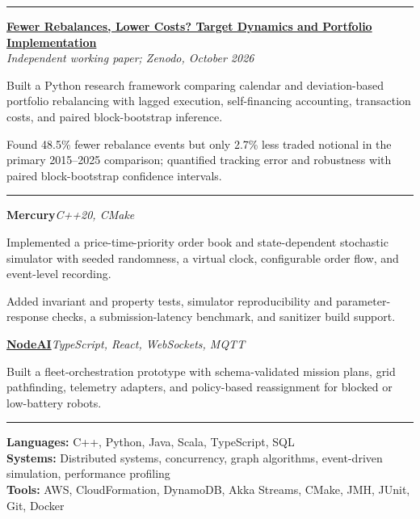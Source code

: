 \documentclass[10pt,letterpaper]{article}
\renewenvironment{itemize}{\begin{list}{\textbullet}{\setlength{\leftmargin}{13pt}\setlength{\itemsep}{2pt}\setlength{\topsep}{3pt}\setlength{\parsep}{0pt}}}{\end{list}}
\renewcommand{\section}[1]{\par\vspace{9pt}{\large\bfseries #1}\par\vspace{2pt}\hrule\vspace{5pt}}
\begin{document}
\section{Research}
\textbf{\href{https://zenodo.org/records/23298207}{Fewer Rebalances, Lower Costs? Target Dynamics and Portfolio Implementation}}\\
\textit{Independent working paper; Zenodo, October 2026}
\begin{itemize}
\item Built a Python research framework comparing calendar and deviation-based portfolio rebalancing with lagged execution, self-financing accounting, transaction costs, and paired block-bootstrap inference.
\item Found 48.5\% fewer rebalance events but only 2.7\% less traded notional in the primary 2015--2025 comparison; quantified tracking error and robustness with paired block-bootstrap confidence intervals.
\end{itemize}

\section{Selected Projects}
\textbf{Mercury}\hfill \textit{C++20, CMake}
\begin{itemize}
\item Implemented a price-time-priority order book and state-dependent stochastic simulator with seeded randomness, a virtual clock, configurable order flow, and event-level recording.
\item Added invariant and property tests, simulator reproducibility and parameter-response checks, a submission-latency benchmark, and sanitizer build support.
\end{itemize}

\textbf{\href{https://github.com/Ekanshthegreat/NodeAI-rework}{NodeAI}}\hfill \textit{TypeScript, React, WebSockets, MQTT}
\begin{itemize}
\item Built a fleet-orchestration prototype with schema-validated mission plans, grid pathfinding, telemetry adapters, and policy-based reassignment for blocked or low-battery robots.
\end{itemize}

\section{Technical Skills}
\textbf{Languages:} C++, Python, Java, Scala, TypeScript, SQL\\
\textbf{Systems:} Distributed systems, concurrency, graph algorithms, event-driven simulation, performance profiling\\
\textbf{Tools:} AWS, CloudFormation, DynamoDB, Akka Streams, CMake, JMH, JUnit, Git, Docker
\end{document}
